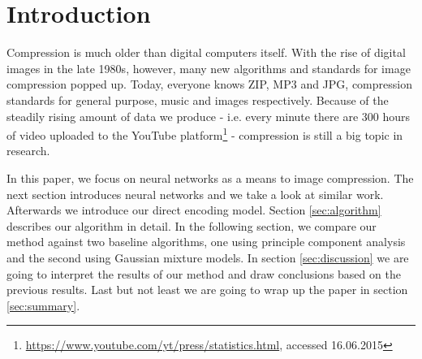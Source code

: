 
\section{Introduction} \label{sec:introduction}
 
Compression is much older than digital computers itself\cite{wolfram2002}. With the rise of digital images in the late 1980s, however, many new algorithms and standards for image compression popped up. Today, everyone knows ZIP, MP3 and JPG, compression standards for general purpose, music and images respectively. Because of the steadily rising amount of data we produce - i.e. every minute there are 300 hours of video uploaded to the YouTube platform\footnote{\url{https://www.youtube.com/yt/press/statistics.html}, accessed 16.06.2015} - compression is still a big topic in research.

In this paper, we focus on neural networks as a means to image compression. The next section introduces neural networks and we take a look at similar work. Afterwards we introduce our direct encoding model. Section \ref{sec:algorithm} describes our algorithm in detail. In the following section, we compare our method against two baseline algorithms, one using principle component analysis and the second using Gaussian mixture models. In section \ref{sec:discussion} we are going to interpret the results of our method and draw conclusions based on the previous results. Last but not least we are going to wrap up the paper in section \ref{sec:summary}.

